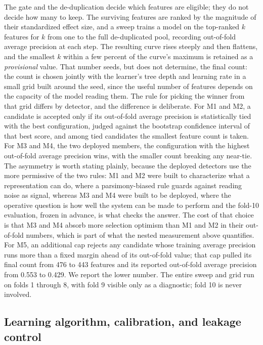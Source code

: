 \documentclass[11pt]{article}
\begin{document}
The gate and the de-duplication decide which features are eligible; they do not decide how many to keep. The surviving features are ranked by the magnitude of their standardized effect size, and a sweep trains a model on the top-ranked $k$ features for $k$ from one to the full de-duplicated pool, recording out-of-fold average precision at each step. The resulting curve rises steeply and then flattens, and the smallest $k$ within a few percent of the curve's maximum is retained as a \emph{provisional} value. That number seeds, but does not determine, the final count: the count is chosen jointly with the learner's tree depth and learning rate in a small grid built around the seed, since the useful number of features depends on the capacity of the model reading them. The rule for picking the winner from that grid differs by detector, and the difference is deliberate. For M1 and M2, a candidate is accepted only if its out-of-fold average precision is statistically tied with the best configuration, judged against the bootstrap confidence interval of that best score, and among tied candidates the smallest feature count is taken. For M3 and M4, the two deployed members, the configuration with the highest out-of-fold average precision wins, with the smaller count breaking any near-tie. The asymmetry is worth stating plainly, because the deployed detectors use the more permissive of the two rules: M1 and M2 were built to characterize what a representation can do, where a parsimony-biased rule guards against reading noise as signal, whereas M3 and M4 were built to be deployed, where the operative question is how well the system can be made to perform and the fold-10 evaluation, frozen in advance, is what checks the answer. The cost of that choice is that M3 and M4 absorb more selection optimism than M1 and M2 in their out-of-fold numbers, which is part of what the nested measurement above quantifies. For M5, an additional cap rejects any candidate whose training average precision runs more than a fixed margin ahead of its out-of-fold value; that cap pulled its final count from 476 to 443 features and its reported out-of-fold average precision from 0.553 to 0.429. We report the lower number. The entire sweep and grid run on folds 1 through 8, with fold 9 visible only as a diagnostic; fold 10 is never involved.

\subsection{Learning algorithm, calibration, and leakage control}
\end{document}
